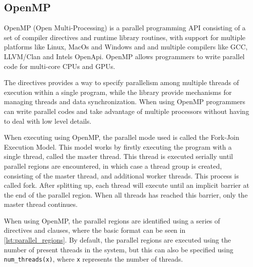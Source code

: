 \subsection{OpenMP}\label{subsec:openmp}

OpenMP (Open Multi-Processing) is a parallel programming API consisting of a set of compiler directives and runtime library routines, with support for multiple platforms like Linux, MacOs and Windows and and multiple compilers like GCC, LLVM/Clan and Intels OpenApi. OpenMP allows programmers to write parallel code for multi-core CPUs and GPUs.\cite{openmp}


The directives provides a way to specify parallelism among multiple threads of execution within a single program, while the library provide mechanisms for managing threads and data synchronization. When using OpenMP programmers can write parallel codes and take advantage of multiple processors without having to deal with low level details.\cite{openmp}


When executing using OpenMP, the parallel mode used is called the Fork-Join Execution Model. This model works by firstly executing the program with a single thread, called the master thread. This thread is executed serially until parallel regions are encountered, in which case a thread group is created, consisting of the master thread, and additional worker threads. This process is called fork. After splitting up, each thread will execute until an implicit barrier at the end of the parallel region. When all threads has reached this barrier, only the master thread continues.\cite{openmp}



When using OpenMP, the parallel regions are identified using a series of directives and clauses, where the basic format can be seen in \cref{lst:parallel_regions}. By default, the parallel regions are executed using the number of present threads in the system, but this can also be specified using \texttt{num\_threads(x)}, where \texttt{x} represents the number of threads.\cite{openmp}

